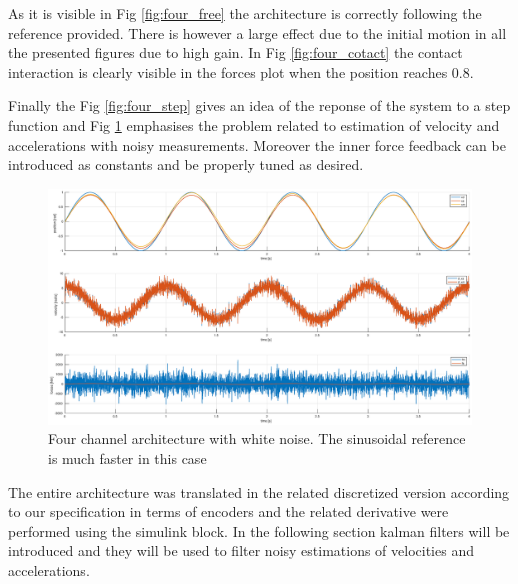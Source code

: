 \documentclass[a4paper,12pt]{article}
\begin{document}
As it is visible in Fig \ref{fig:four_free} the architecture is correctly following the reference provided. There is however a large effect due to the initial motion in all the presented figures due to high gain. In Fig \ref{fig:four_cotact} the contact interaction is clearly visible in the forces plot when the position reaches 0.8. 

Finally the Fig \ref{fig:four_step} gives an idea of the reponse of the system to a step function and Fig \ref{fig:four_noisy} emphasises the problem related to estimation of velocity and accelerations with noisy measurements. Moreover the inner force feedback can be introduced as constants and be properly tuned as desired.

\begin{figure}[H]
    \begin{center}
        \hspace*{-4.2cm}
        \includegraphics[scale=0.4]{images/four_noisy.eps}
    \end{center}
    \caption{Four channel architecture with white noise. The sinusoidal reference is much faster in this case}
    \label{fig:four_noisy}
\end{figure}

\noindent The entire architecture was translated in the related discretized version according to our specification in terms of encoders and the related derivative were performed using the simulink block. In the following section kalman filters will be introduced and they will be used to filter noisy estimations of velocities and accelerations.
\end{document}
